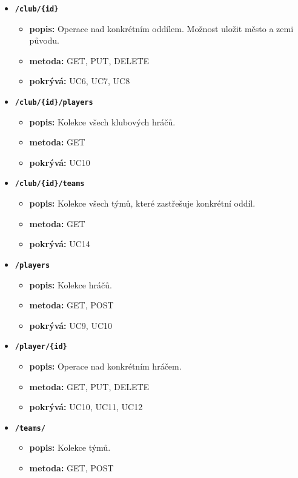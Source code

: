 \begin{itemize}
\begin{itemize}
  \end{itemize}
  \item \texttt{\textbf{/club/\{id\}}}
  \begin{itemize}
    \item \textbf{popis:} Operace nad konkrétním oddílem. Možnost uložit město a zemi původu.
    \item \textbf{metoda:} GET, PUT, DELETE
    \item \textbf{pokrývá:} UC6, UC7, UC8
  \end{itemize}
  \item \texttt{\textbf{/club/\{id\}/players}}
  \begin{itemize}
    \item \textbf{popis:} Kolekce všech klubových hráčů.
    \item \textbf{metoda:} GET
    \item \textbf{pokrývá:} UC10
  \end{itemize}
  \item \texttt{\textbf{/club/\{id\}/teams}}
  \begin{itemize}
    \item \textbf{popis:} Kolekce všech týmů, které zastřešuje konkrétní oddíl.
    \item \textbf{metoda:} GET
    \item \textbf{pokrývá:} UC14
  \end{itemize}
  \item \texttt{\textbf{/players}}
  \begin{itemize}
    \item \textbf{popis:} Kolekce hráčů.
    \item \textbf{metoda:} GET, POST
    \item \textbf{pokrývá:} UC9, UC10
  \end{itemize}
  \item \texttt{\textbf{/player/\{id\}}}
  \begin{itemize}
    \item \textbf{popis:} Operace nad konkrétním hráčem.
    \item \textbf{metoda:} GET, PUT, DELETE
    \item \textbf{pokrývá:} UC10, UC11, UC12
  \end{itemize}
  \item \texttt{\textbf{/teams/}}
  \begin{itemize}
    \item \textbf{popis:} Kolekce týmů.
    \item \textbf{metoda:} GET, POST

\end{itemize}
\end{itemize}
